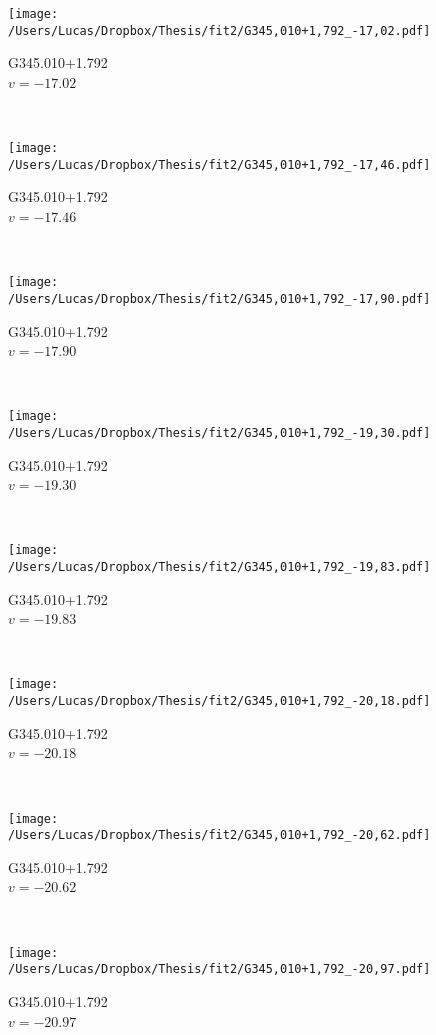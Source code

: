 \begin{figure*}[t]\ContinuedFloat
	\centering
	\begin{subfigure}[t]{0.3\textwidth}
		\texttt{[image: /Users/Lucas/Dropbox/Thesis/fit2/G345,010+1,792\_-17,02.pdf]}
		\caption[]{G345.010+1.792\\$v=-17.02$\,\kms}
	\end{subfigure}
	~
	\begin{subfigure}[t]{0.3\textwidth}
		\texttt{[image: /Users/Lucas/Dropbox/Thesis/fit2/G345,010+1,792\_-17,46.pdf]}
		\caption[]{G345.010+1.792\\$v=-17.46$\,\kms}
	\end{subfigure}
	~
	\begin{subfigure}[t]{0.3\textwidth}
		\texttt{[image: /Users/Lucas/Dropbox/Thesis/fit2/G345,010+1,792\_-17,90.pdf]}
		\caption[]{G345.010+1.792\\$v=-17.90$\,\kms}
	\end{subfigure}
	~
	\begin{subfigure}[t]{0.3\textwidth}
		\texttt{[image: /Users/Lucas/Dropbox/Thesis/fit2/G345,010+1,792\_-19,30.pdf]}
		\caption[]{G345.010+1.792\\$v=-19.30$\,\kms}
	\end{subfigure}
	~
	\begin{subfigure}[t]{0.3\textwidth}
		\texttt{[image: /Users/Lucas/Dropbox/Thesis/fit2/G345,010+1,792\_-19,83.pdf]}
		\caption[]{G345.010+1.792\\$v=-19.83$\,\kms}
	\end{subfigure}
	~
	\begin{subfigure}[t]{0.3\textwidth}
		\texttt{[image: /Users/Lucas/Dropbox/Thesis/fit2/G345,010+1,792\_-20,18.pdf]}
		\caption[]{G345.010+1.792\\$v=-20.18$\,\kms}
	\end{subfigure}
	~
	\begin{subfigure}[t]{0.3\textwidth}
		\texttt{[image: /Users/Lucas/Dropbox/Thesis/fit2/G345,010+1,792\_-20,62.pdf]}
		\caption[]{G345.010+1.792\\$v=-20.62$\,\kms}
	\end{subfigure}
	~
	\begin{subfigure}[t]{0.3\textwidth}
		\texttt{[image: /Users/Lucas/Dropbox/Thesis/fit2/G345,010+1,792\_-20,97.pdf]}
		\caption[]{G345.010+1.792\\$v=-20.97$\,\kms}

\end{subfigure}
\end{figure*}
